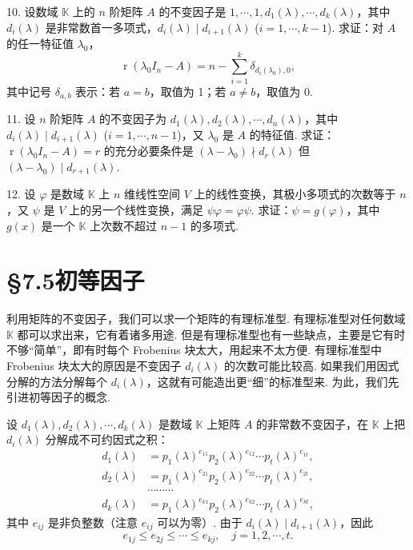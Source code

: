 \documentclass[UTF8, 12pt, fontset=fandol, oneside]{ctexart}
\begin{document}
10. 设数域 $\mathbb{K}$ 上的 $n$ 阶矩阵 $A$ 的不变因子是 $1,\cdots,1,d_1(\lambda),\cdots,d_k(\lambda)$，其中 $d_i(\lambda)$ 是非常数首一多项式，$d_i(\lambda)\mid d_{i+1}(\lambda)$ ($i=1,\cdots,k-1$). 求证：对 $A$ 的任一特征值 $\lambda_0$，
\[
\operatorname{r}(\lambda_0I_n-A)=n-\sum_{i=1}^k\delta_{d_i(\lambda_0),0},
\]
其中记号 $\delta_{a,b}$ 表示：若 $a=b$，取值为 1；若 $a\neq b$，取值为 0.

11. 设 $n$ 阶矩阵 $A$ 的不变因子为 $d_1(\lambda),d_2(\lambda),\cdots,d_n(\lambda)$，其中 $d_i(\lambda)\mid d_{i+1}(\lambda)$ ($i=1,\cdots,n-1$)，又 $\lambda_0$ 是 $A$ 的特征值. 求证：$\operatorname{r}(\lambda_0I_n-A)=r$ 的充分必要条件是 $(\lambda-\lambda_0)\nmid d_r(\lambda)$ 但 $(\lambda-\lambda_0)\mid d_{r+1}(\lambda)$.

12. 设 $\varphi$ 是数域 $\mathbb{K}$ 上 $n$ 维线性空间 $V$ 上的线性变换，其极小多项式的次数等于 $n$，又 $\psi$ 是 $V$ 上的另一个线性变换，满足 $\psi\varphi=\varphi\psi$. 求证：$\psi=g(\varphi)$，其中 $g(x)$ 是一个 $\mathbb{K}$ 上次数不超过 $n-1$ 的多项式.

\section*{§7.5\quad 初等因子}

利用矩阵的不变因子，我们可以求一个矩阵的有理标准型. 有理标准型对任何数域 $\mathbb{K}$ 都可以求出来，它有着诸多用途. 但是有理标准型也有一些缺点，主要是它有时不够“简单”，即有时每个 Frobenius 块太大，用起来不太方便. 有理标准型中 Frobenius 块太大的原因是不变因子 $d_i(\lambda)$ 的次数可能比较高. 如果我们用因式分解的方法分解每个 $d_i(\lambda)$，这就有可能造出更“细”的标准型来. 为此，我们先引进初等因子的概念.

设 $d_1(\lambda),d_2(\lambda),\cdots,d_k(\lambda)$ 是数域 $\mathbb{K}$ 上矩阵 $A$ 的非常数不变因子，在 $\mathbb{K}$ 上把 $d_i(\lambda)$ 分解成不可约因式之积：
\begin{equation}
\begin{aligned}
d_1(\lambda)&=p_1(\lambda)^{e_{11}}p_2(\lambda)^{e_{12}}\cdots p_t(\lambda)^{e_{1t}},\\
d_2(\lambda)&=p_1(\lambda)^{e_{21}}p_2(\lambda)^{e_{22}}\cdots p_t(\lambda)^{e_{2t}},\\
&\cdots\cdots\cdots\\
d_k(\lambda)&=p_1(\lambda)^{e_{k1}}p_2(\lambda)^{e_{k2}}\cdots p_t(\lambda)^{e_{kt}},
\end{aligned}
\tag{7.5.1}
\end{equation}
其中 $e_{ij}$ 是非负整数（注意 $e_{ij}$ 可以为零）. 由于 $d_i(\lambda)\mid d_{i+1}(\lambda)$，因此
\[
e_{1j}\leq e_{2j}\leq\cdots\leq e_{kj},\quad j=1,2,\cdots,t.
\]
\end{document}
